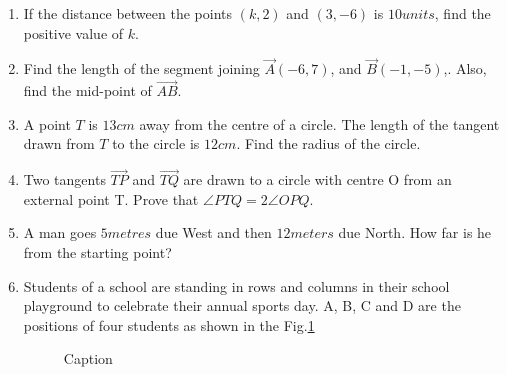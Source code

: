 \documentclass{article}
\begin{document}
\begin{enumerate}
\item  If the distance between the points $(k, 2)$ and $(3,-6)$ is $10 units$, find the positive value of $k$. 
			
\item  Find the length of the segment joining $\vec{A}(-6, 7)$, and $\vec{B}(-1, -5)$,. Also, find the mid-point of $ \vec{AB} $. 
	
\item  A point $T$ is $13 cm$ away from the centre of a circle. The length of the tangent drawn from $T$ to the circle is $12 cm$. Find the radius of the circle. 
	
\item  Two tangents $ \vec{TP} $ and $ \vec{TQ} $ are drawn to a circle with centre O from an external point T. Prove that $\angle PTQ= 2 \angle OPQ$. 

\item  A man goes $5 metres$ due West and then $12 meters$ due North. How far is he from the starting point?

\item Students of a school are standing in rows and columns in their school playground to celebrate their annual sports day. A, B, C and D are the positions of four students as shown in the Fig.\ref{fig:3}

	\begin{figure}[!h]
	\centering
	
	\caption{Caption}
	\label{fig:3}
        \end{figure}	
	

\end{enumerate}
\end{document}
